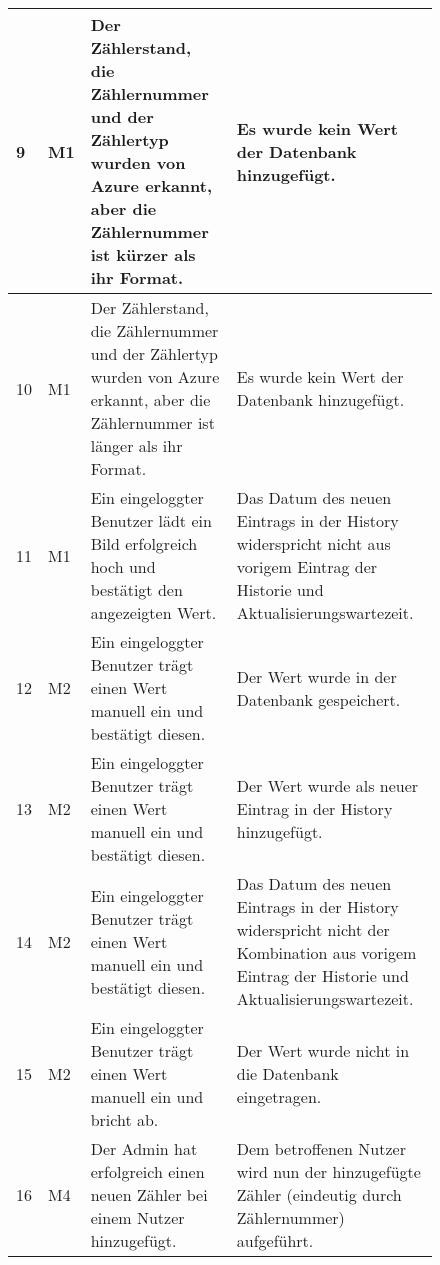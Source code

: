 	\begin{figure}[!h]
		\begin{center}
			\begin{tabularx}{\textwidth}{ p{} | p{} | p{} | X }
				\hline
				9 & M1 & Der Zählerstand, die Zählernummer und der Zählertyp wurden von Azure erkannt, aber die Zählernummer ist kürzer als ihr Format.  & Es wurde kein Wert der Datenbank hinzugefügt. \\ \hline
				10 & M1 & Der Zählerstand, die Zählernummer und der Zählertyp wurden von Azure erkannt, aber die Zählernummer ist länger als ihr Format.  & Es wurde kein Wert der Datenbank hinzugefügt. \\ \hline
				11 & M1 & Ein eingeloggter Benutzer lädt ein Bild erfolgreich hoch und bestätigt den angezeigten Wert.  & Das Datum des neuen Eintrags in der History widerspricht nicht aus vorigem Eintrag der Historie und Aktualisierungswartezeit. \\ \hline
				12 & M2 & Ein eingeloggter Benutzer trägt einen Wert manuell ein und bestätigt diesen. & Der Wert wurde in der Datenbank gespeichert. \\ \hline
				13 & M2 & Ein eingeloggter Benutzer trägt einen Wert manuell ein und bestätigt diesen. & Der Wert wurde als neuer Eintrag in der History hinzugefügt. \\ \hline
				14 & M2 & Ein eingeloggter Benutzer trägt einen Wert manuell ein und bestätigt diesen. & Das Datum des neuen Eintrags in der History widerspricht nicht der Kombination aus vorigem Eintrag der Historie und Aktualisierungswartezeit. \\ \hline
				15 & M2 & Ein eingeloggter Benutzer trägt einen Wert  manuell ein und bricht ab. & Der Wert wurde nicht in die Datenbank eingetragen. \\ \hline
				16 & M4 & Der Admin hat erfolgreich einen neuen Zähler bei einem Nutzer hinzugefügt.   & Dem betroffenen Nutzer wird nun der hinzugefügte Zähler (eindeutig durch Zählernummer) aufgeführt. \\ \hline
			\end{tabularx}	
		\end{center}
		\end{figure}
		
